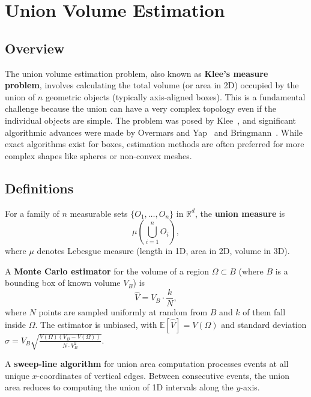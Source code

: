 \section{Union Volume Estimation}
\label{sec:union_volume_estimation}

\subsection{Overview}
The union volume estimation problem, also known as \textbf{Klee's measure problem}, involves calculating the total volume (or area in 2D) occupied by the union of $n$ geometric objects (typically axis-aligned boxes). This is a fundamental challenge because the union can have a very complex topology even if the individual objects are simple. The problem was posed by Klee~\cite{klee1977}, and significant algorithmic advances were made by Overmars and Yap~\cite{overmars1991} and Bringmann~\cite{bringmann2012}. While exact algorithms exist for boxes, estimation methods are often preferred for more complex shapes like spheres or non-convex meshes.

\subsection{Definitions}

\begin{definition}\label{def:union_measure}
For a family of $n$ measurable sets $\{O_1, \dots, O_n\}$ in $\mathbb{R}^d$, the \textbf{union measure} is
\[
\mu\!\left(\bigcup_{i=1}^{n} O_i\right),
\]
where $\mu$ denotes Lebesgue measure (length in 1D, area in 2D, volume in 3D).
\end{definition}

\begin{definition}\label{def:monte_carlo}
A \textbf{Monte Carlo estimator} for the volume of a region $\Omega \subset B$ (where $B$ is a bounding box of known volume $V_B$) is
\[
\hat{V} = V_B \cdot \frac{k}{N},
\]
where $N$ points are sampled uniformly at random from $B$ and $k$ of them fall inside $\Omega$. The estimator is unbiased, with $\mathbb{E}[\hat{V}] = V(\Omega)$ and standard deviation $\sigma = V_B \sqrt{\frac{V(\Omega)(V_B - V(\Omega))}{N \cdot V_B^2}}$.
\end{definition}

\begin{definition}\label{def:sweep_line_area}
A \textbf{sweep-line algorithm} for union area computation processes events at all unique $x$-coordinates of vertical edges. Between consecutive events, the union area reduces to computing the union of 1D intervals along the $y$-axis.
\end{definition}

